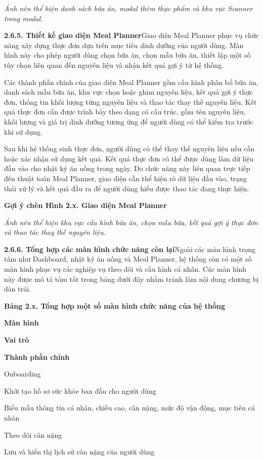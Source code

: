 \textit{Ảnh nên thể hiện danh sách bữa ăn, modal thêm thực phẩm và khu vực Scanner trong modal.}

\textbf{2.6.5. Thiết kế giao diện Meal Planner}Giao diện Meal Planner phục vụ chức năng xây dựng thực đơn dựa trên mục tiêu dinh dưỡng của người dùng. Màn hình này cho phép người dùng chọn bữa ăn, chọn mẫu bữa ăn, thiết lập một số tùy chọn liên quan đến nguyên liệu và nhận kết quả gợi ý từ hệ thống.

Các thành phần chính của giao diện Meal Planner gồm cấu hình phân bổ bữa ăn, danh sách mẫu bữa ăn, khu vực chọn hoặc ghim nguyên liệu, kết quả gợi ý thực đơn, thông tin khối lượng từng nguyên liệu và thao tác thay thế nguyên liệu. Kết quả thực đơn cần được trình bày theo dạng có cấu trúc, gồm tên nguyên liệu, khối lượng và giá trị dinh dưỡng tương ứng để người dùng có thể kiểm tra trước khi sử dụng.

Sau khi hệ thống sinh thực đơn, người dùng có thể thay thế nguyên liệu nếu cần hoặc xác nhận sử dụng kết quả. Kết quả thực đơn có thể được dùng làm dữ liệu đầu vào cho nhật ký ăn uống trong ngày. Do chức năng này liên quan trực tiếp đến thuật toán Meal Planner, giao diện cần thể hiện rõ dữ liệu đầu vào, trạng thái xử lý và kết quả đầu ra để người dùng hiểu được thao tác đang thực hiện.

\textbf{Gợi ý chèn Hình 2.x. Giao diện Meal Planner}

\textit{Ảnh nên thể hiện khu vực cấu hình bữa ăn, chọn mẫu bữa, kết quả gợi ý thực đơn và thao tác thay thế nguyên liệu.}

\textbf{2.6.6. Tổng hợp các màn hình chức năng còn lại}Ngoài các màn hình trọng tâm như Dashboard, nhật ký ăn uống và Meal Planner, hệ thống còn có một số màn hình phục vụ các nghiệp vụ theo dõi và cấu hình cá nhân. Các màn hình này được mô tả tóm tắt trong bảng dưới đây nhằm tránh làm nội dung chương bị dàn trải.

\textbf{Bảng 2.x. Tổng hợp một số màn hình chức năng của hệ thống}

\textbf{Màn hình}

\textbf{Vai trò}

\textbf{Thành phần chính}

Onboarding

Khởi tạo hồ sơ sức khỏe ban đầu cho người dùng

Biểu mẫu thông tin cá nhân, chiều cao, cân nặng, mức độ vận động, mục tiêu cá nhân

Theo dõi cân nặng

Lưu và hiển thị lịch sử cân nặng của người dùng

